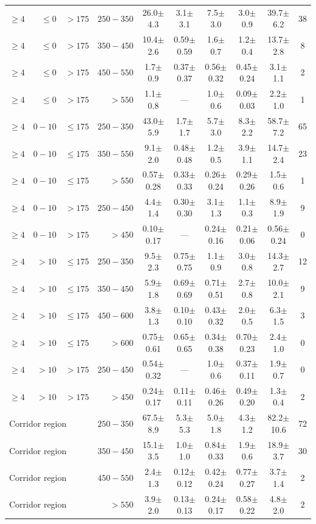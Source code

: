 \begin{table}[htbp]
\begin{tabular}{|r|r|r|r|c|c|c|c|c|c|}
\hline
$\geq4$ & $\leq0$ &     $>175$ & $250-350$ & 26.0$\pm$4.3 & 3.1$\pm$3.1 & 7.5$\pm$3.0 & 3.0$\pm$0.9 & 39.7$\pm$6.2 & 38 \\
$\geq4$ & $\leq0$ &     $>175$ & $350-450$ & 10.4$\pm$2.6 & 0.59$\pm$0.59 & 1.6$\pm$0.7 & 1.2$\pm$0.4 & 13.7$\pm$2.8 & 8 \\
$\geq4$ & $\leq0$ &     $>175$ & $450-550$ & 1.7$\pm$0.9 & 0.37$\pm$0.37 & 0.56$\pm$0.32 & 0.45$\pm$0.24 & 3.1$\pm$1.1 & 2 \\
$\geq4$ & $\leq0$ &     $>175$ &    $>550$ & 1.1$\pm$0.8 & --- & 1.0$\pm$0.6 & 0.09$\pm$0.03 & 2.2$\pm$1.0 & 1 \\
\hline
$\geq4$ &   $0-10$ & $\leq175$ & $250-350$ & 43.0$\pm$5.9 & 1.7$\pm$1.7 & 5.7$\pm$3.0 & 8.3$\pm$2.2 & 58.7$\pm$7.2 & 65 \\
$\geq4$ &   $0-10$ & $\leq175$ & $350-550$ & 9.1$\pm$2.0 & 0.48$\pm$0.48 & 1.2$\pm$0.5 & 3.9$\pm$1.1 & 14.7$\pm$2.4 & 23 \\
$\geq4$ &   $0-10$ & $\leq175$ &    $>550$ & 0.57$\pm$0.28 & 0.33$\pm$0.33 & 0.26$\pm$0.24 & 0.29$\pm$0.26 & 1.5$\pm$0.6 & 1 \\
\hline
$\geq4$ &   $0-10$ &     $>175$ & $250-450$ & 4.4$\pm$1.4 & 0.30$\pm$0.30 & 3.1$\pm$1.3 & 1.1$\pm$0.3 & 8.9$\pm$1.9 & 9 \\
$\geq4$ &   $0-10$ &     $>175$ &    $>450$ & 0.10$\pm$0.17 & --- & 0.24$\pm$0.16 & 0.21$\pm$0.06 & 0.56$\pm$0.24 & 0 \\
\hline
$\geq4$ &    $>10$ & $\leq175$ & $250-350$ & 9.5$\pm$2.3 & 0.75$\pm$0.75 & 1.1$\pm$0.9 & 3.0$\pm$0.8 & 14.3$\pm$2.7 & 12 \\
$\geq4$ &    $>10$ & $\leq175$ & $350-450$ & 5.9$\pm$1.8 & 0.69$\pm$0.69 & 0.71$\pm$0.51 & 2.7$\pm$0.8 & 10.0$\pm$2.1 & 9 \\
$\geq4$ &    $>10$ & $\leq175$ & $450-600$ & 3.8$\pm$1.3 & 0.10$\pm$0.10 & 0.43$\pm$0.32 & 2.0$\pm$0.5 & 6.3$\pm$1.5 & 3 \\
$\geq4$ &    $>10$ & $\leq175$ &    $>600$ & 0.75$\pm$0.61 & 0.65$\pm$0.65 & 0.34$\pm$0.38 & 0.70$\pm$0.23 & 2.4$\pm$1.0 & 0 \\
\hline
$\geq4$ &    $>10$ &     $>175$ & $250-450$ & 0.54$\pm$0.32 & --- & 1.0$\pm$0.6 & 0.37$\pm$0.11 & 1.9$\pm$0.7 & 0 \\
$\geq4$ &    $>10$ &     $>175$ &    $>450$ & 0.24$\pm$0.17 & 0.11$\pm$0.11 & 0.46$\pm$0.26 & 0.49$\pm$0.20 & 1.3$\pm$0.4 & 2 \\
\hline
\multicolumn{3}{|l|}{Corridor region} & $250-350$ & 67.5$\pm$8.9 & 5.3$\pm$5.3 & 5.0$\pm$1.8 & 4.3$\pm$1.2 & 82.2$\pm$10.6 & 72 \\
\multicolumn{3}{|l|}{Corridor region} & $350-450$ & 15.1$\pm$3.5 & 1.0$\pm$1.0 & 0.84$\pm$0.33 & 1.9$\pm$0.6 & 18.9$\pm$3.7 & 30 \\
\multicolumn{3}{|l|}{Corridor region} & $450-550$ & 2.4$\pm$1.3 & 0.12$\pm$0.12 & 0.42$\pm$0.24 & 0.77$\pm$0.27 & 3.7$\pm$1.4 & 2 \\
\multicolumn{3}{|l|}{Corridor region} &    $>550$ & 3.9$\pm$2.0 & 0.13$\pm$0.13 & 0.24$\pm$0.17 & 0.58$\pm$0.22 & 4.8$\pm$2.0 & 2 \\
\hline
\end{tabular}
\end{table}

